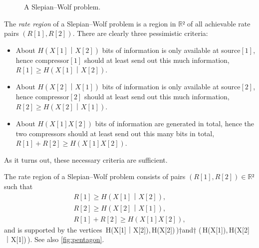 \documentclass[openany]{amsbook}
\makeatletter
\numberwithin{equation}{chapter}
\numberwithin{figure}{chapter}
\numberwithin{table}{chapter}
\def\bigl@C#1{\bigl#1}					\def\bigr@C#1{\bigr#1}
\def\({\bigl@C(}	\def\){\bigr@C)}	令（{\Bigl(}			令）{\Bigr)}
\def\[#1\]{\begin{equation*}{#1}\end{equation*}}
\theoremstyle{definition}	理dfn:Definition~?s			理exa:Example~?s
\theoremstyle{remark}		理cla:Claim~?s				理rem:Remark~?s
\makeatother
\begin{document}
	\begin{figure}
		\caption{
			A Slepian--Wolf problem.
		}\label{fig:2sender}
	\end{figure}
	
	The \emph{rate region} of a Slepian--Wolf problem
	is a region in $ℝ²$ of all achievable rate pairs $(R[1],R[2])$.
	There are clearly three pessimistic criteria:
	\begin{itemize}
		\item	About $H(X[1]｜X[2])$ bits of information is only available at
				source$[1]$, hence compressor$[1]$ should at least
				send out this much information, $R[1]≥H(X[1]｜X[2])$.
		\item	About $H(X[2]｜X[1])$ bits of information is only available at
				source$[2]$, hence compressor$[2]$ should at least
				send out this much information, $R[2]≥H(X[2]｜X[1])$.
		\item	About $H(X[1]X[2])$ bits of information are generated in total,
				hence the two compressors should at least
				send out this many bits in total, $R[1]+R[2]≥H(X[1]X[2])$.
	\end{itemize}
	As it turns out, these necessary criteria are sufficient.
	
	\begin{thm}
		\cite{SW73}
		The rate region of a Slepian--Wolf problem
		consists of pairs $(R[1],R[2])∈ℝ²$ such that
		\begin{gather*}
			R[1]≥H(X[1]｜X[2]),		\\
			R[2]≥H(X[2]｜X[1]),		\\
			R[1]+R[2]≥H(X[1]X[2]),	
		\end{gather*}
		and is supported by the vertices
		\[\(\,H(X[1]｜X[2]),\,H(X[2])\,\)\quad†and†\quad
			\(\,H(X[1]),\,H(X[2]｜X[1])\,\).\]
		See also \cref{fig:pentagon}.
	\end{thm}
	
\end{document}
